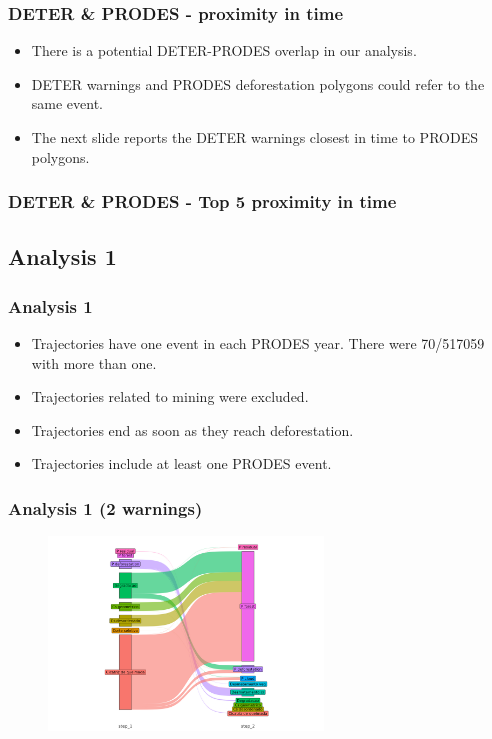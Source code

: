 \documentclass[aspectratio=169]{beamer}
\begin{document}
\begin{frame}[allowframebreaks]
    \frametitle{DETER \& PRODES - proximity in time}
    \begin{itemize}
        \item There is a potential DETER-PRODES overlap in our analysis.
        \item DETER warnings and PRODES deforestation polygons could refer to
            the same event.
        \item The next slide reports the DETER warnings closest in 
            time to PRODES polygons.
    \end{itemize}
\end{frame}

\begin{frame}[allowframebreaks]
    \frametitle{DETER \& PRODES - Top 5 proximity in time}
    
\end{frame}



\subsection{Analysis 1}

\begin{frame}
    \frametitle{Analysis 1}
    \begin{itemize}
        \item Trajectories have one event in each PRODES year. There were 
            70/517059 with more than one.
        \item Trajectories related to mining were excluded.
        \item Trajectories end as soon as they reach deforestation.
        \item Trajectories include at least one PRODES event.
    \end{itemize}
\end{frame}

\begin{frame}
    \frametitle{Analysis 1 (2 warnings) }
    \begin{figure}[h] 
    \includegraphics[width=0.65\textwidth]{./figures/an1_plot_deter_prodes_subarea_trajectory_2.png}
    \end{figure}
\end{frame}
\end{document}
